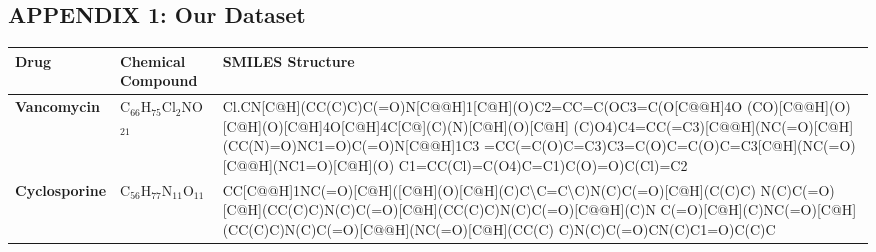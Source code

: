 \documentclass[conference]{IEEEtran}
\begin{document}
\subsection*{\centering APPENDIX 1: Our Dataset}
\begin{table}[h]
  \centering
  \renewcommand{\arraystretch}{1.2}
  \begin{tabular}{|>{\bfseries}l|l|p{10cm}|}
    \hline
    \textbf{Drug}                            & \textbf{Chemical Compound}             & \textbf{SMILES Structure}                                                                                                                                                                                                                                                                                                                                                                                                                                                                                                                                                       \\
    \hline
    Vancomycin                               & C$_{66}$H$_{75}$Cl$_2$NO$_{21}$        & Cl.CN[C@H](CC(C)C)C(=O)N[C@@H]1[C@H](O)C2=CC=C(OC3=C(O[C@@H]4O \newline [C@H](CO)[C@@H](O)[C@H](O)[C@H]4O[C@H]4C[C@](C)(N)[C@H](O)[C@H] \newline (C)O4)C4=CC(=C3)[C@@H](NC(=O)[C@H](CC(N)=O)NC1=O)C(=O)N[C@@H]1C3 \newline =CC(=C(O)C=C3)C3=C(O)C=C(O)C=C3[C@H](NC(=O)[C@@H](NC1=O)[C@H](O) \newline C1=CC(Cl)=C(O4)C=C1)C(O)=O)C(Cl)=C2                                                                                                                                                                                                                                        \\
    \hline
    Cyclosporine                             & C$_{56}$H$_{77}$N$_{11}$O$_{11}$       & CC[C@@H]1NC(=O)[C@H]([C@H](O)[C@H](C)C\textbackslash C=C\textbackslash C)N(C)C(=O)[C@H](C(C)C) \newline N(C)C(=O)[C@H](CC(C)C)N(C)C(=O)[C@H](CC(C)C)N(C)C(=O)[C@@H](C)N \newline C(=O)[C@H](C)NC(=O)[C@H](CC(C)C)N(C)C(=O)[C@@H](NC(=O)[C@H](CC(C) \newline C)N(C)C(=O)CN(C)C1=O)C(C)C                                                                                                                                                                                                                                                                                          \\

\end{tabular}
\end{table}
\end{document}

